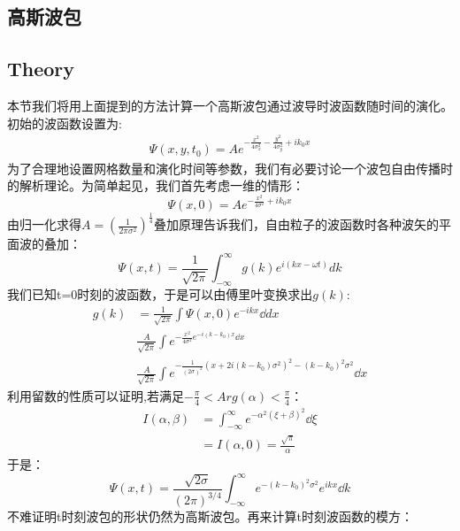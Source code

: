 \begin{multicols}{2}
\section{高斯波包}
\subsection{Theory}
本节我们将用上面提到的方法计算一个高斯波包通过波导时波函数随时间的演化。初始的波函数设置为:
\begin{align}
    \Psi(x,y,t_0)=Ae^{-\frac{x^2}{4\sigma _x^2}-\frac{y^2}{4\sigma _y^2}+ik_0x}
\end{align}
为了合理地设置网格数量和演化时间等参数，我们有必要讨论一个波包自由传播时的解析理论。为简单起见，我们首先考虑一维的情形：
\begin{equation}
    \Psi(x,0)=Ae^{-\frac{x^2}{4\sigma^2}+ik_0x}
\end{equation}
由归一化求得$A=(\frac{1}{2\pi\sigma^2})^\frac{1}{4}$叠加原理告诉我们，自由粒子的波函数时各种波矢的平面波的叠加：
\begin{equation}
    \Psi(x,t)=\frac{1}{\sqrt{2\pi}}\int_{-\infty}^{\infty}g(k)e^{i(kx-\omega t)}dk
\end{equation}
我们已知t=0时刻的波函数，于是可以由傅里叶变换求出$g(k)$:
\begin{equation}
    \begin{aligned}
        g(k)&=\frac{1}{\sqrt{2\pi}}\int \Psi(x,0)e^{-ikx}\dd{dx}\\
        &\frac{A}{\sqrt{2\pi}}\int e^{-\frac{x^2}{4\sigma^2}e^{-i(k-k_0)x}\dd{x}}\\
        &\frac{A}{\sqrt{2\pi}}\int e^{-\frac{1}{(2\sigma)^2}(x+2i(k-k_0)\sigma^2)^2-(k-k_0)^2\sigma^2}\dd{x}
    \end{aligned}
\end{equation}
利用留数的性质可以证明,若满足$-\frac{\pi}{4}<Arg(\alpha)<\frac{\pi}{4}$：
\begin{equation}
    \begin{aligned}
        I(\alpha,\beta)&=\int_{-\infty}^{\infty}e^{-\alpha^2(\xi+\beta)^2}\dd{\xi}\\
        &=I(\alpha,0)=\frac{\sqrt{\pi}}{\alpha}
    \end{aligned}
\end{equation}
于是：
\begin{equation}
    \Psi(x,t)=\frac{\sqrt{2\sigma}}{(2\pi)^{3/4}}\int_{-\infty}^{\infty}e^{-(k-k_0)^2\sigma^2}e^{ikx}\dd{k}
\end{equation}
不难证明t时刻波包的形状仍然为高斯波包。再来计算t时刻波函数的模方：

\end{multicols}
